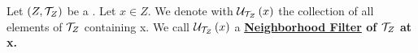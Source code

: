 \label{def:NeighborhoodFilter}   
\newcommand{\NeighborhoodFilter}[0]{
    \bf \hyperref[def:NeighborhoodFilter]{Neighborhood Filter} \rm
}
\newcommand{\NeighborhoodFilters}[0]{
    \bf \hyperref[def:NeighborhoodFilter]{Neighborhood Filters} \rm
}
\newcommand{\NbhFilter}[2]{
    \scU_{#1}\pa{#2}
}
\begin{df}
    Let $(Z, \mathcal{T}_Z)$ be a \TopologicalSpaceRef.
    Let $x \in Z$. 
    We denote with $\NbhFilter{\Topology{Z}{\T}}{x}$ the collection of all elements of $\mathcal{T}_Z$ containing x. 
    We call $\NbhFilter{\Topology{Z}{\T}}{x}$ a \NeighborhoodFilter  of $\mathcal{T}_Z$ at x. 
\end{df}

